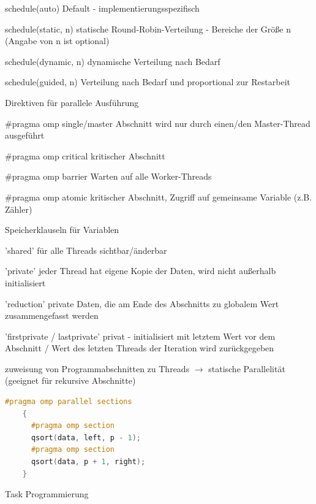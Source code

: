 \documentclass[10pt]{article}
\begin{document}
\begin{itemize*}
  \begin{description*}
    \item[schedule(auto)] Default - implementierungsspezifisch
    \item[schedule(static, n)] statische Round-Robin-Verteilung - Bereiche der Größe n (Angabe von n ist optional)
    \item[schedule(dynamic, n)] dynamische Verteilung nach Bedarf
    \item[schedule(guided, n)] Verteilung nach Bedarf und proportional zur Restarbeit
  \end{description*}
  \item Direktiven für parallele Ausführung
  \begin{description*}
    \item[\#pragma omp single/master] Abschnitt wird nur durch einen/den Master-Thread ausgeführt
    \item[\#pragma omp critical] kritischer Abschnitt
    \item[\#pragma omp barrier] Warten auf alle Worker-Threads
    \item[\#pragma omp atomic] kritischer Abschnitt, Zugriff auf gemeinsame Variable (z.B. Zähler)
  \end{description*}
  \item Speicherklauseln für Variablen
  \begin{itemize*}
    \item 'shared' für alle Threads sichtbar/änderbar
    \item 'private' jeder Thread hat eigene Kopie der Daten, wird nicht außerhalb initialisiert
    \item 'reduction' private Daten, die am Ende des Abschnitts zu globalem Wert zusammengefasst werden
    \item 'firstprivate / lastprivate' privat - initialisiert mit letztem Wert vor dem Abschnitt / Wert des letzten Threads der Iteration wird zurückgegeben
  \end{itemize*}
  \item zuweisung von Programmabschnitten zu Threads $\rightarrow$ statische Parallelität (geeignet für rekursive Abschnitte)
  \begin{lstlisting}[language=C++]
    #pragma omp parallel sections
    {
      #pragma omp section
      qsort(data, left, p - 1);
      #pragma omp section
      qsort(data, p + 1, right);
    }
    \end{lstlisting}
  \item Task Programmierung
  \begin{itemize*}

\end{itemize*}
\end{itemize*}
\end{document}

